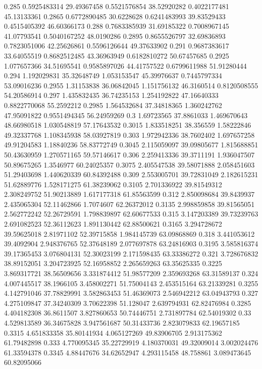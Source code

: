 {0.285 0.5925483314 29.49367458 0.5521576854 38.52920282 0.4022177481 45.13133361
0.2865 0.6772890485 30.6228628 0.6241483993 39.83529433 0.4515405392 46.60366173
0.288 0.7683385939 31.69185322 0.7008967145 41.07793541 0.5040167252 48.0190286
0.2895 0.8655526797 32.69836893 0.7823051006 42.25626861 0.5596126644 49.37633902
0.291 0.9687383617 33.64055519 0.8682512485 43.36963949 0.6182810272 50.67457685
0.2925 1.077657366 34.51695541 0.9585897026 44.41757522 0.6799611988 51.91280444
0.294 1.192029831 35.32648749 1.053153547 45.39976637 0.7445797334 53.09016236
0.2955 1.31153838 36.06842045 1.151756132 46.3160514 0.8120508555 54.20586914
0.297 1.435832435 36.74235153 1.254192822 47.16640333 0.8822770068 55.2592212
0.2985 1.564532684 37.34818365 1.360242762 47.95091822 0.9551494345 56.24959269
0.3 1.69723565 37.8861033 1.469670643 48.66980518 1.030548819 57.17643532
0.3015 1.833518251 38.356559 1.58222846 49.32337768 1.108345938 58.03927819
0.303 1.972942336 38.7602402 1.697657258 49.91204583 1.18840236 58.83772749
0.3045 2.115059097 39.09805677 1.815688851 50.43630959 1.270571165 59.57146617
0.306 2.259413336 39.3711191 1.936047507 50.89675265 1.3546977 60.24025357
0.3075 2.405547538 39.58071888 2.058451603 51.29403698 1.440620339 60.84392488
0.309 2.553005701 39.72831049 2.182615231 51.62889776 1.528171275 61.38239062
0.3105 2.701336922 39.81549312 2.308249752 51.90213889 1.617177318 61.85563599
0.312 2.850098684 39.8439937 2.435065304 52.11462866 1.7074607 62.26372012
0.3135 2.998859858 39.81565051 2.562772242 52.26729591 1.798839897 62.60677533
0.315 3.147203389 39.73239763 2.691082523 52.36112623 1.891130442 62.88500621
0.3165 3.294728672 39.59625018 2.81971102 52.39715858 1.984145739 63.09868869
0.318 3.441053612 39.4092904 2.948376765 52.37648189 2.077697878 63.24816903
0.3195 3.585816374 39.17365453 3.076804131 52.30023199 2.171598435 63.33386272
0.321 3.728676832 38.89152051 3.204723925 52.16958852 2.265659263 63.35625335
0.3225 3.869317721 38.56509656 3.331874412 51.98577209 2.359693268 63.31589137
0.324 4.007445517 38.1966105 3.458002271 51.75004143 2.453515164 63.21339281
0.3255 4.142791046 37.78829991 3.582863453 51.46369073 2.546942212 63.04943793
0.327 4.275109847 37.34240309 3.70622398 51.128047 2.639794931 62.82476984
0.3285 4.404182308 36.8611507 3.827860653 50.74446751 2.731897784 62.54019302
0.33 4.529813589 36.34675828 3.947561687 50.31433736 2.823079833 62.19657185
0.3315 4.651833358 35.80141934 4.065127269 49.83906705 2.913175362 61.79482898
0.333 4.770095345 35.22729919 4.180370031 49.32009014 3.002024476 61.33594378
0.3345 4.88447676 34.62652947 4.293115458 48.758861 3.089473645 60.82095066
}
